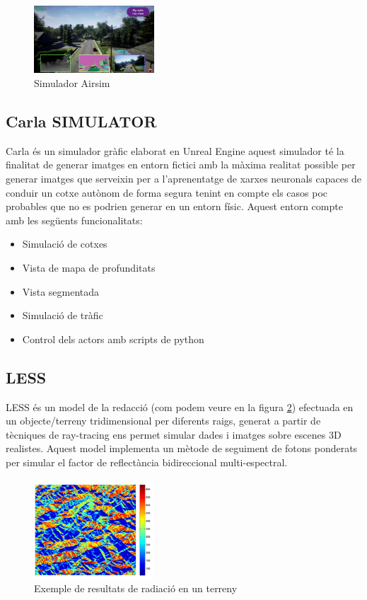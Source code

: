 \documentclass[10pt,a4paper,twocolumn,twoside]{article}
\begin{document}
\begin{figure}[!h]
\centering
  	\includegraphics[width=0.4\textwidth]{airsim}
	\caption{Simulador Airsim}
	\label{fig-airsim}
\end{figure}

\subsection{Carla SIMULATOR}
Carla és un simulador gràfic elaborat en Unreal Engine aquest simulador té la finalitat de generar imatges en entorn fictici amb la màxima realitat possible per generar imatges que serveixin per a l'aprenentatge de xarxes neuronals capaces de conduir un cotxe autònom de forma segura tenint en compte els casos poc probables que no es podrien generar en un entorn físic. Aquest entorn compte amb les següents funcionalitats:

\begin{itemize}
  \item Simulació de cotxes
  \item Vista de mapa de profunditats
  \item Vista segmentada
  \item Simulació de tràfic
  \item Control dels actors amb scripts de python
\end{itemize}

\subsection{LESS}
LESS és un model de la redacció (com podem veure en la figura \ref{fig-lessradiacio}) efectuada en un objecte/terreny tridimensional per diferents raigs, generat a partir de tècniques de ray-tracing ens permet simular dades i imatges sobre escenes 3D realistes. Aquest model implementa un mètode de seguiment de fotons ponderats per simular el factor de reflectància bidireccional multi-espectral.

\begin{figure}[!h]
\centering
  	\includegraphics[width=0.4\textwidth]{lessradiacio}
	\caption{Exemple de resultats de radiació en un terreny}
	\label{fig-lessradiacio}
\end{figure}
\end{document}
